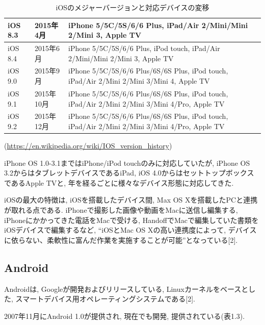 \begin{table}[tb]
\begin{center}
\begin{tabular}{|l|l|p{10cm}|}
iOS 8.3 & 2015年4月 & iPhone 5/5C/5S/6/6 Plus, iPad/Air 2/Mini/Mini 2/Mini 3, Apple TV \\ \hline
iOS 8.4 & 2015年6月 & iPhone 5/5C/5S/6/6 Plus, iPod touch, iPad/Air 2/Mini/Mini 2/Mini 3, Apple TV \\ \hline
iOS 9.0 & 2015年9月 & iPhone 5/5C/5S/6/6 Plus/6S/6S Plus, iPod touch, iPad/Air 2/Mini 2/Mini 3/Mini 4, Apple TV \\ \hline
iOS 9.1 & 2015年10月 & iPhone 5/5C/5S/6/6 Plus/6S/6S Plus, iPod touch, iPad/Air 2/Mini 2/Mini 3/Mini 4/Pro, Apple TV \\ \hline
iOS 9.2 & 2015年12月 & iPhone 5/5C/5S/6/6 Plus/6S/6S Plus, iPod touch, iPad/Air 2/Mini 2/Mini 3/Mini 4/Pro, Apple TV \\ \hline
\end{tabular}
\caption{iOSのメジャーバージョンと対応デバイスの変移}
\end{center}
\begin{flushright}
(\url{https://en.wikipedia.org/wiki/IOS_version_history})
\end{flushright}
\end{table}

iPhone OS 1.0-3.1まではiPhone/iPod touchのみに対応していたが, iPhone OS 3.2からはタブレットデバイスであるiPad, iOS 4.0からはセットトップボックスであるApple TVと, 年を経るごとに様々なデバイス形態に対応してきた.

iOSの最大の特徴は, iOSを搭載したデバイス間, Max OS Xを搭載したPCと連携が取れる点である.
iPhoneで撮影した画像や動画をMacに送信し編集する, iPhoneにかかってきた電話をMacで受ける, HandoffでMacで編集していた書類をiOSデバイスで編集するなど, “iOSとMac OS Xの高い連携度によって, デバイスに依らない、柔軟性に富んだ作業を実施することが可能”となっている[2].

\subsection{Android}
Androidは, Googleが開発およびリリースしている, Linuxカーネルをベースとした, スマートデバイス用オペレーティングシステムである[2].

2007年11月にAndroid 1.0が提供され, 現在でも開発, 提供されている(表1.3).

